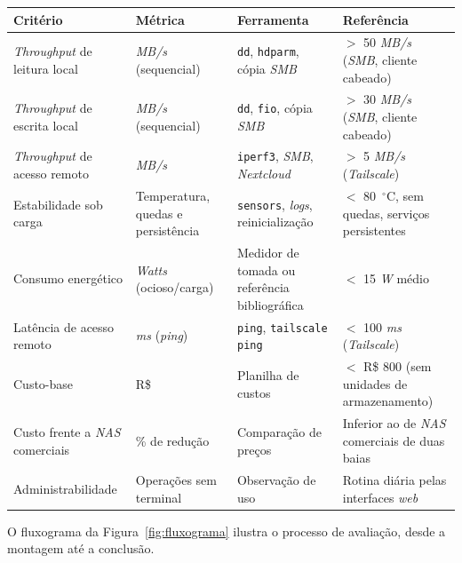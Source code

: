 \begin{quadro}[H]
    \centering
    \small
    \renewcommand{\arraystretch}{1.15}
    \begin{tabularx}{\linewidth}{|>{\raggedright\arraybackslash}X|>{\raggedright\arraybackslash}X|>{\raggedright\arraybackslash}X|>{\raggedright\arraybackslash}X|}
        \hline
        \textbf{Critério} & \textbf{Métrica} & \textbf{Ferramenta} & \textbf{Referência} \\
        \hline
        \hline
        \textit{Throughput} de leitura local & \textit{MB/s} (sequencial) & \texttt{dd}, \texttt{hdparm}, cópia \textit{SMB} & $>$ 50 \textit{MB/s} (\textit{SMB}, cliente cabeado) \\
        \hline
        \textit{Throughput} de escrita local & \textit{MB/s} (sequencial) & \texttt{dd}, \texttt{fio}, cópia \textit{SMB} & $>$ 30 \textit{MB/s} (\textit{SMB}, cliente cabeado) \\
        \hline
        \textit{Throughput} de acesso remoto & \textit{MB/s} & \texttt{iperf3}, \textit{SMB}, \textit{Nextcloud} & $>$ 5 \textit{MB/s} (\textit{Tailscale}) \\
        \hline
        Estabilidade sob carga & Temperatura, quedas e persistência & \texttt{sensors}, \textit{logs}, reinicialização & $<$ 80~$^\circ$C, sem quedas, serviços persistentes \\
        \hline
        Consumo energético & \textit{Watts} (ocioso/carga) & Medidor de tomada ou referência bibliográfica & $<$ 15 \textit{W} médio \\
        \hline
        Latência de acesso remoto & \textit{ms} (\textit{ping}) & \texttt{ping}, \texttt{tailscale ping} & $<$ 100 \textit{ms} (\textit{Tailscale}) \\
        \hline
        Custo-base & R\$ & Planilha de custos & $<$ R\$ 800 (sem unidades de armazenamento) \\
        \hline
        Custo frente a \textit{NAS} comerciais & \% de redução & Comparação de preços & Inferior ao de \textit{NAS} comerciais de duas baias \\
        \hline
        Administrabilidade & Operações sem terminal & Observação de uso & Rotina diária pelas interfaces \textit{web} \\
        \hline
    \end{tabularx}
    \vspace{0.2cm}
    \fonteautoria
\end{quadro}

O fluxograma da Figura~\ref{fig:fluxograma} ilustra o processo de avaliação, desde a montagem até a conclusão.

\begin{figure}[H]
    \centering
    \fonteautoria
\end{figure}
